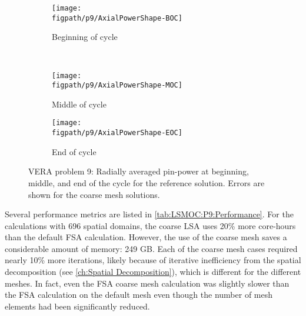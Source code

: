 {{{      \begin{figure}[h]
        \centering
        \begin{subfigure}[t]{0.49\textwidth}
          \centering
          \texttt{[image: \\figpath/p9/AxialPowerShape-BOC]}
          \caption{Beginning of cycle\label{fig:LSMOC:P9:AxialPowerShape:BOC}}
        \end{subfigure}%
        ~
        \begin{subfigure}[t]{0.49\textwidth}
          \centering
          \texttt{[image: \\figpath/p9/AxialPowerShape-MOC]}
          \caption{Middle of cycle\label{fig:LSMOC:P9:AxialPowerShape:MOC}}
        \end{subfigure}
        \begin{subfigure}[t]{0.49\textwidth}
          \centering
          \texttt{[image: \\figpath/p9/AxialPowerShape-EOC]}
          \caption{End of cycle\label{fig:LSMOC:P9:AxialPowerShape:EOC}}
        \end{subfigure}%
        \caption{
          VERA problem 9: Radially averaged pin-power at beginning, middle, and end of the cycle for the reference solution.
          Errors are shown for the coarse mesh solutions.
          \label{figs:LSMOC:P9:AxialPowerShape}
          }
      \end{figure}

      Several performance metrics are listed in \cref{tab:LSMOC:P9:Performance}.
      For the calculations with 696 spatial domains, the coarse \ac{LSA} uses 20\% more core-hours than the default \ac{FSA} calculation.
      However, the use of the coarse mesh saves a considerable amount of memory: 249 GB.
      Each of the coarse mesh cases required nearly 10\% more iterations, likely because of iterative inefficiency from the spatial decomposition (see \cref{ch:Spatial Decomposition}), which is different for the different meshes.
      In fact, even the \ac{FSA} coarse mesh calculation was slightly slower than the \ac{FSA} calculation on the default mesh even though the number of mesh elements had been significantly reduced.

}}}
